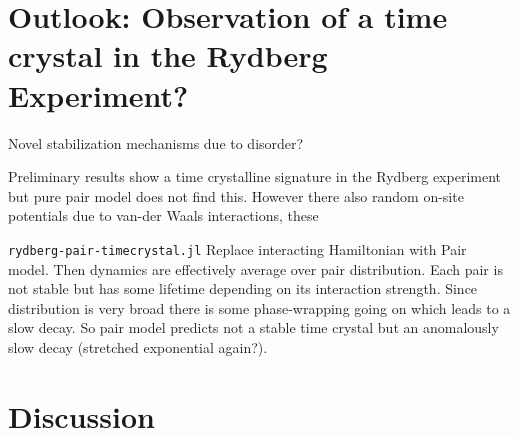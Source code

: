 \chapter{Outlook: Observation of a time crystal in the Rydberg Experiment?}
Novel stabilization mechanisms due to disorder?

Preliminary results show a time crystalline signature in the Rydberg experiment but pure pair model does not find this. However there also random on-site potentials due to van-der Waals interactions, these 

\texttt{rydberg-pair-timecrystal.jl}
Replace interacting Hamiltonian with Pair model. Then dynamics are effectively average over pair  distribution. Each pair is not stable but has some lifetime depending on its interaction strength. Since distribution is very broad there is some phase-wrapping going on which leads to a slow decay. So pair model predicts not a stable time crystal but an anomalously slow decay (stretched exponential again?).

\chapter{Discussion}\label{ch:floquet-discussion}

